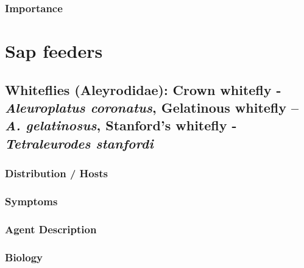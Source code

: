 \documentclass[
]{book}
\begin{document}
\subsection*{Importance}\label{importance-8}

\chapter*{Sap feeders}\label{sap-feeders}

\section*{\texorpdfstring{Whiteflies (Aleyrodidae): Crown whitefly - \emph{Aleuroplatus coronatus}, Gelatinous whitefly -- \emph{A. gelatinosus}, Stanford's whitefly - \emph{Tetraleurodes stanfordi}}{Whiteflies (Aleyrodidae): Crown whitefly - Aleuroplatus coronatus, Gelatinous whitefly -- A. gelatinosus, Stanford's whitefly - Tetraleurodes stanfordi}}\label{whiteflies-aleyrodidae-crown-whitefly---aleuroplatus-coronatus-gelatinous-whitefly-a.-gelatinosus-stanfords-whitefly---tetraleurodes-stanfordi}

\subsection*{Distribution / Hosts}\label{distribution-hosts-9}

\subsection*{Symptoms}\label{symptoms-9}

\subsection*{Agent Description}\label{agent-description-9}

\subsection*{Biology}\label{biology-9}
\end{document}
